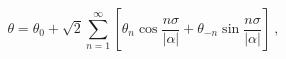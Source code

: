 \begin{equation}
\theta = \theta_{0} + \sqrt{2} \sum_{n=1}^{\infty} 
\left[ \theta_{n} \cos \frac{n \sigma}{|\alpha|} +
\theta_{-n} \sin \frac{n \sigma}{|\alpha|} \right]~,
\label{svexpa7}
\end{equation}

